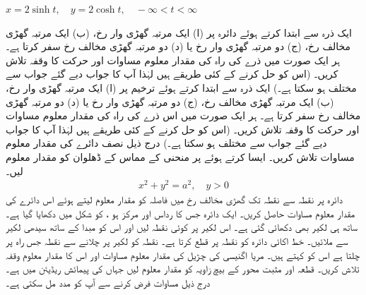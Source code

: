 $x=2\sinh t,\quad y=2\cosh t,\quad -\infty<t<\infty$


ایک ذرہ  سے ابتدا کرتے ہوئے دائرہ   پر (ا) ایک  مرتبہ گھڑی وار رخ، (ب) ایک  مرتبہ گھڑی  مخالف رخ، (ج) دو مرتبہ گھڑی وار  رخ یا (د) دو مرتبہ گھڑی مخالف رخ سفر کرتا ہے۔ ہر ایک صورت میں  ذرے کی راہ کی مقدار معلوم مساوات اور حرکت کا وقفہ تلاش کریں۔ (اس کو حل کرنے کے کئی طریقے ہیں لہٰذا آپ کا  جواب دیے گئے جواب سے مختلف ہو سکتا ہے۔)
ایک ذرہ  سے ابتدا کرتے ہوئے ترخیم   پر  (ا) ایک مرتبہ  گھڑی وار  رخ، (ب) ایک مرتبہ گھڑی مخالف رخ، (ج) دو مرتبہ گھڑی وار رخ یا (د) دو مرتبہ گھڑی مخالف  رخ سفر کرتا ہے۔ ہر ایک صورت میں اس ذرے کی راہ کی مقدار معلوم مساوات اور حرکت کا وقفہ تلاش کریں۔ (اس کو حل کرنے کے کئی طریقے ہیں لہٰذا آپ کا  جواب دیے گئے جواب سے مختلف ہو سکتا ہے۔)
درج ذیل نصف دائرے کی مقدار معلوم مساوات تلاش کریں۔ ایسا کرتے  ہوئے  پر منحنی کے مماس کے ڈھلوان  کو مقدار معلوم لیں۔
\begin{align*}
x^2+y^2=a^2,\quad y>0
\end{align*}
دائرہ  پر نقطہ  سے نقطہ  تک گھڑی مخالف  رخ میں   فاصلہ  کو مقدار معلوم لیتے ہوئے  اس دائرے کی مقدار معلوم مساوات حاصل کریں۔
ایک دائرہ جس کا رداس  اور مرکز  ہو ، کو شکل  میں دکھایا گیا ہے۔ ساتھ ہی لکیر  بھی دکھائی گئی ہے۔ اس لکیر پر کوئی نقطہ  لیں اور اس کو مبدا  کے ساتھ سیدھی لکیر سے ملائیں۔ خط  اکائی دائرہ کو نقطہ  پر قطع کرتا ہے۔ نقطہ  کو لکیر  پر چلانے سے نقطہ  جس راہ پر چلتا ہے اس کو کہتے ہیں۔ مریا اگنیسی کی چڑیل کی مقدار معلوم مساوات اور اس کا مقدار معلوم وقفہ تلاش کریں۔ قطعہ  اور مثبت محور  کے بیچ زاویہ  کو مقدار معلوم لیں جہاں  کی پیمائش ریڈیئن میں  ہے۔درج ذیل مساوات فرض کرنے سے آپ کو مدد مل سکتی ہے۔
